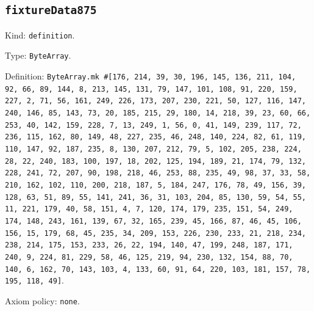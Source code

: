 \documentclass[11pt]{article}
\begin{document}
\subsection*{\texttt{fixtureData875}}
\noindent Kind: \texttt{definition}.\par
\noindent Type: \texttt{ByteArray}.\par
\noindent Definition: \texttt{ByteArray.mk \#[176, 214, 39, 30, 196, 145, 136, 211, 104, 92, 66, 89, 144, 8, 213, 145, 131, 79, 147, 101, 108, 91, 220, 159, 227, 2, 71, 56, 161, 249, 226, 173, 207, 230, 221, 50, 127, 116, 147, 240, 146, 85, 143, 73, 20, 185, 215, 29, 180, 14, 218, 39, 23, 60, 66, 253, 40, 142, 159, 228, 7, 13, 249, 1, 56, 0, 41, 149, 239, 117, 72, 236, 115, 162, 80, 149, 48, 227, 235, 46, 248, 140, 224, 82, 61, 119, 110, 147, 92, 187, 235, 8, 130, 207, 212, 79, 5, 102, 205, 238, 224, 28, 22, 240, 183, 100, 197, 18, 202, 125, 194, 189, 21, 174, 79, 132, 228, 241, 72, 207, 90, 198, 218, 46, 253, 88, 235, 49, 98, 37, 33, 58, 210, 162, 102, 110, 200, 218, 187, 5, 184, 247, 176, 78, 49, 156, 39, 128, 63, 51, 89, 55, 141, 241, 36, 31, 103, 204, 85, 130, 59, 54, 55, 11, 221, 179, 40, 58, 151, 4, 7, 120, 174, 179, 235, 151, 54, 249, 174, 148, 243, 161, 139, 67, 32, 165, 239, 45, 166, 87, 46, 45, 106, 156, 15, 179, 68, 45, 235, 34, 209, 153, 226, 230, 233, 21, 218, 234, 238, 214, 175, 153, 233, 26, 22, 194, 140, 47, 199, 248, 187, 171, 240, 9, 224, 81, 229, 58, 46, 125, 219, 94, 230, 132, 154, 88, 70, 140, 6, 162, 70, 143, 103, 4, 133, 60, 91, 64, 220, 103, 181, 157, 78, 195, 118, 49]}.\par
\noindent Axiom policy: \texttt{none}.\par
\end{document}
